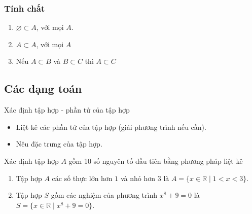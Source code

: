 \subsubsection{Tính chất}
\begin{tc}
	\hfill
	\begin{enumerate}
		\item $\varnothing \subset A$, với mọi $A$.
		\item $A \subset A$, với mọi $A$
		\item Nếu $A\subset B$ và $B\subset C$ thì $A\subset C$
	\end{enumerate}
\end{tc}

\subsection{Các dạng toán}
\begin{dang}{Xác định tập hợp - phần tử của tập hợp}
\begin{itemize}
	\item Liệt kê các phần tử của tập hợp (giải phương trình nếu cần).
	\item Nêu đặc trưng của tập hợp.
\end{itemize}
\end{dang}
\begin{vd}
Xác định tập hợp $A$ gồm 10 số nguyên tố đầu tiên bằng phương pháp liệt kê
\loigiai{
\[ A=\{2; 3; 5; 7; 11; 13; 17; 19; 23; 29 \}\]
}
\end{vd}
\begin{vd}
	\hfill	
\begin{enumerate}
	\item Tập hợp $A$ các số thực lớn hơn $1$ và nhỏ hơn $3$ là $A=\{x\in \mathbb{R} \mid 1<x<3\}$.
	\item Tập hợp $S$ gồm các nghiệm của phương trình $x^8+9=0$ là $S=\{x\in \mathbb{R} \mid x^8+9=0\}$.
\end{enumerate}
\end{vd}

